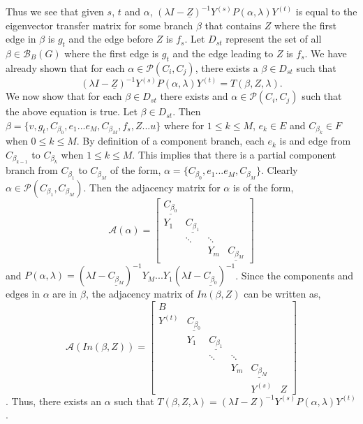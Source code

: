 \documentclass{paper}
\begin{document}
Thus we see that given $s$, $t$ and $\alpha$, $(\lambda	I - \underline{Z})^{-1}Y^{(s)} P(\alpha,\lambda) Y^{(t)}$ is equal to the eigenvector transfer matrix for some branch $\beta$ that contains $Z$ where the first edge in $\beta$ is $g_t$ and the edge before $Z$ is $f_s$. Let $D_{st}$ represent the set of all $\beta \in \mathcal{B}_B(G)$ where the first edge is $g_t$ and the edge leading to $Z$ is $f_s$.  We have already shown that for each $\alpha \in \mathcal{P}(C_i,C_j)$, there exists a $\beta \in D_{st}$ such that 
\[
(\lambda	I - \underline{Z})^{-1}Y^{(s)} P(\alpha,\lambda) Y^{(t)}
=
T(\beta,Z, \lambda).
\]
We now show that for each $\beta \in D_{st}$ there exists and $\alpha \in \mathcal{P}(C_i,C_j)$ such that the above equation is true. Let $\beta \in D_{st}$. Then $\beta	 = \{v,g_t, C_{\beta_0}, e_1 ... e_{M}, C_{\beta_M}, f_s, Z ... u\}$ where for $1 \leq k \leq M$, $e_k \in E$ and $C_{\beta_k} \in F$ when $0 \leq k \leq M$. By definition of a component branch, each $e_k$ is and edge from $C_{\beta_{k-1}} $ to $ C_{\beta_k}$ when $1 \leq k \leq M$. This implies that there is a partial component branch from $C_{\beta_1}$ to $C_{\beta_M}$ of the form, $\alpha = \{ C_{\beta_0}, e_1 ... e_M, C_{\beta_M} \}$. Clearly $\alpha \in \mathcal{P}(C_{\beta_1},C_{\beta_M})$. Then the adjacency matrix for $\alpha$ is of the form,
\[
\mathcal{A}(\alpha)
=
\begin{bmatrix}
\underline{C_{\beta_0}} \\
Y_1 & \underline{C_{\beta_1}} \\
    & \ddots & \ddots \\
    & 		   & Y_m & \underline{C_{\beta_M}}
\end{bmatrix}
\]
and
 $P(\alpha, \lambda) = (\lambda I - \underline{C_{\beta_M}})^{-1} Y_M ... Y_1 (\lambda I - \underline{C_{\beta_0}})^{-1}$. Since the components and edges in $\alpha$ are in $\beta$, the adjacency matrix of $In(\beta,Z)$ can be written as,
 \[
 \mathcal{A}(In(\beta,Z))
 =
\begin{bmatrix}
B \\
Y^{(t)} & \underline{C_{\beta_0}} \\
        & Y_1 & \underline{C_{\beta_1}} \\
    		&	& \ddots & \ddots \\
    		&	& 		   & Y_m & \underline{C_{\beta_M}} \\
    		&	&			&	& Y^{(s)} & Z
\end{bmatrix}
\].
Thus, there exists an $\alpha$ such that $T(\beta,Z,\lambda) = (\lambda I - Z)^{-1} Y^{(s)} P(\alpha, \lambda) Y^{(t)}$. 
\end{document}
